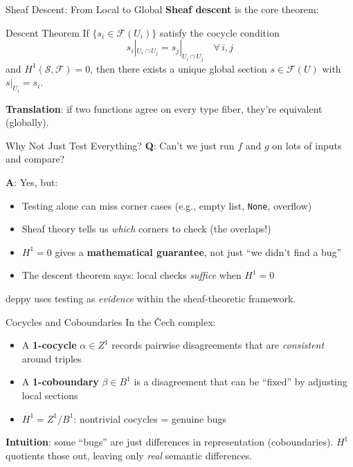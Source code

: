 \documentclass[aspectratio=169,11pt]{beamer}
\newcommand{\site}{\mathcal{S}}
\begin{document}
\begin{frame}{Sheaf Descent: From Local to Global}
\textbf{Sheaf descent} is the core theorem:

\begin{block}{Descent Theorem}
If $\{s_i \in \mathcal{F}(U_i)\}$ satisfy the cocycle condition
\[
s_i|_{U_i \cap U_j} = s_j|_{U_i \cap U_j} \quad \forall\, i,j
\]
and $H^1(\site, \mathcal{F}) = 0$, then there exists a unique global section $s \in \mathcal{F}(U)$ with $s|_{U_i} = s_i$.
\end{block}

\vspace{0.3em}
\textbf{Translation}: if two functions agree on every type fiber, they're equivalent (globally).
\end{frame}

\begin{frame}{Why Not Just Test Everything?}
\textbf{Q}: Can't we just run $f$ and $g$ on lots of inputs and compare?

\vspace{0.5em}
\textbf{A}: Yes, but:
\begin{itemize}
\item Testing alone can miss corner cases (e.g., empty list, \texttt{None}, overflow)
\item Sheaf theory tells us \emph{which} corners to check (the overlaps!)
\item $H^1 = 0$ gives a \textbf{mathematical guarantee}, not just ``we didn't find a bug''
\item The descent theorem says: local checks \emph{suffice} when $H^1 = 0$
\end{itemize}

\vspace{0.5em}
deppy uses testing as \emph{evidence} within the sheaf-theoretic framework.
\end{frame}

\begin{frame}{Cocycles and Coboundaries}
In the \v{C}ech complex:
\begin{itemize}
\item A \textbf{1-cocycle} $\alpha \in Z^1$ records pairwise disagreements that are \emph{consistent} around triples
\item A \textbf{1-coboundary} $\beta \in B^1$ is a disagreement that can be ``fixed'' by adjusting local sections
\item $H^1 = Z^1 / B^1$: nontrivial cocycles = genuine bugs
\end{itemize}

\vspace{0.5em}
\textbf{Intuition}: some ``bugs'' are just differences in representation (coboundaries). $H^1$ quotients those out, leaving only \emph{real} semantic differences.
\end{frame}
\end{document}
